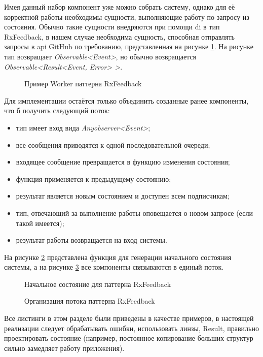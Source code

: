 Имея данный набор компонент уже можно собрать систему, однако для её корректной работы необходимы сущности, выполняющие работу по запросу из состояния. Обычно такие сущности внедряются при помощи \gls{di} в тип RxFeedback, в нашем случае необходима сущность, способная отправлять запросы в \gls{api} GitHub по требованию, представленная на рисунке \ref{sec:development:arch:ios:rxfeedback:example:worker}. На рисунке тип возвращает \textit{Observable<Event>}, но обычно возвращается \textit{Observable<Result<Event, Error> >}.

\begin{figure}[h]
  
   \caption{Пример Worker паттерна RxFeedback}
   \label{sec:development:arch:ios:rxfeedback:example:worker}
\end{figure}

Для имплементации остаётся только объединить созданные ранее компоненты, что б получить следующий поток:

\begin{itemize}
  \item тип имеет вход вида \textit{Any\gls{observer}<Event>};
  \item все сообщения приводятся к одной последовательной очереди;
  \item входящее сообщение превращается в функцию изменения состояния;
  \item функция применяется к предыдущему состоянию;
  \item результат является новым состоянием и доступен всем подписчикам;
  \item тип, отвечающий за выполнение работы оповещается о новом запросе (если такой имеется);
  \item результат работы возвращается на вход системы.
\end{itemize}

На рисунке \ref{sec:development:arch:ios:rxfeedback:example:initial-state} представлена функция для генерации начального состояния системы, а на рисунке \ref{sec:development:arch:ios:rxfeedback:example:composition} все компоненты связываются в единый поток.

\begin{figure}[h]
  
   \caption{Начальное состояние для паттерна RxFeedback}
   \label{sec:development:arch:ios:rxfeedback:example:initial-state}
\end{figure}

\begin{figure}[h]
  
   \caption{Организация потока паттерна RxFeedback}
   \label{sec:development:arch:ios:rxfeedback:example:composition}
\end{figure}

Все листинги в этом разделе были приведены в качестве примеров, в настоящей реализации следует обрабатывать ошибки, использовать линзы, Result, правильно проектировать состояние (например, постоянное копирование больших структур сильно замедляет работу приложения).

\FloatBarrier